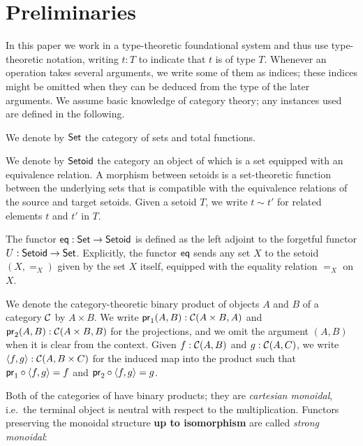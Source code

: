 \documentclass[conference,10pt]{IEEEtran}
\begin{document}
\section{Preliminaries}\label{sec:preliminaries}

In this paper we work in a type-theoretic foundational system and thus use type-theoretic notation,  writing $t:T$ to indicate that $t$ is of type $T$. 
Whenever an operation takes several arguments, we write some of them as indices; these indices might be omitted when 
they can be deduced from the type of the later arguments.
We assume basic knowledge of category theory; any instances used are defined in the following.

\begin{definition}\label{def:set_setoid}
 We denote by $\Set$ the category of sets and total functions. 
 
 We denote by $\Setoid$ the category an object of which is a set equipped with an equivalence relation.
 A morphism between setoids is a set-theoretic function between the underlying sets that is compatible with the equivalence relations of the source and target setoids.
 Given a setoid $T$, we write $t\sim t'$ for related elements $t$ and $t'$ in $T$.
\end{definition}



\begin{definition}\label{def:eq}
 The functor $\eq : \Set\to\Setoid$ is defined as the left adjoint to the forgetful functor 
  $U : \Setoid \to \Set$.
  Explicitly, the functor $\eq$ sends any set $X$ to the setoid $(X,=_X)$ given by the set $X$ itself, equipped
  with the equality relation $=_X$ on $X$.
\end{definition}


\begin{remark}
  We denote the category-theoretic binary product of objects $A$ and $B$ of a category $\C$ by $A\times B$.
  We write $\pr_1(A,B) : \C(A\times B, A)$ and $\pr_2(A,B) :\C(A\times B, B)$ for the projections, and we omit the 
  argument $(A,B)$ when it is clear from the context.
  Given $f : \C(A, B)$ and $g : \C(A,C)$, we write $\langle f,g\rangle : \C(A,B\times C)$ for the induced map into the product such that
  $\comp{\langle f,g\rangle}{\pr_1} = f$ and $\comp{\langle f,g\rangle}{\pr_2} = g$.
\end{remark}

Both of the categories of  have binary products; they are \emph{cartesian monoidal}, i.e.\ the terminal 
object is neutral with respect to the multiplication. Functors preserving the monoidal structure \textbf{up to isomorphism}
are called \emph{strong monoidal}:
\end{document}
